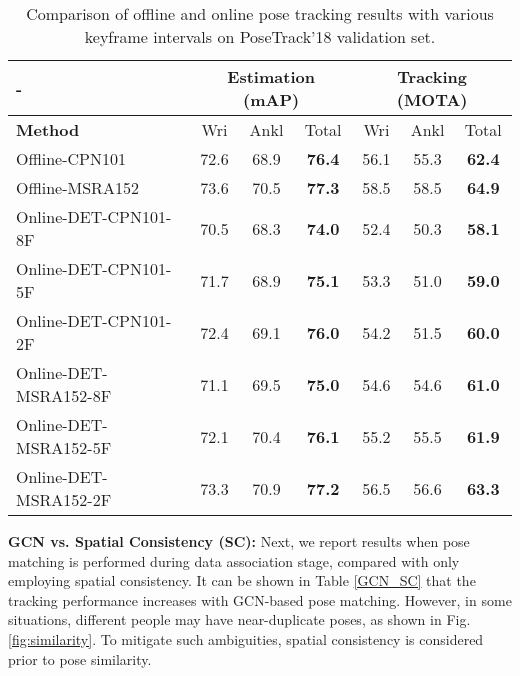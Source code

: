 \documentclass[10pt,twocolumn,letterpaper]{article}
\begin{document}
	\begin{table}[h]
		\vspace{-3pt}
		\setlength{\tabcolsep}{5pt}
		\footnotesize
		\centering 
		\begin{tabular}{lcccccc}
			\toprule
			\multicolumn{1}{l}{ - }  
			&
			\multicolumn{3}{c}{ \textbf{Estimation (mAP) }}  
			&                                            
			\multicolumn{3}{c}{ \textbf{Tracking (MOTA)}} \\\midrule
			\textbf{Method} & Wri  & Ankl & Total  & Wri  & Ankl & Total \\
			\midrule
			Offline-CPN101  &72.6 &68.9 &\textbf{76.4}  &56.1 &55.3 &\textbf{62.4}\\
			Offline-MSRA152  &73.6 &70.5 &\textbf{77.3}  &58.5 &58.5 &\textbf{64.9}\\
			\midrule
			Online-DET-CPN101-8F  &70.5 &68.3 &\textbf{74.0}  &52.4 &50.3 &\textbf{58.1}\\
			Online-DET-CPN101-5F   &71.7  &68.9  &\textbf{75.1}  &53.3 &51.0 &\textbf{59.0}\\
			Online-DET-CPN101-2F   &72.4 &69.1 &\textbf{76.0}  &54.2 &51.5 &\textbf{60.0}\\
			\midrule
			Online-DET-MSRA152-8F  &71.1 &69.5 &\textbf{75.0}  &54.6 &54.6 &\textbf{61.0}\\
			Online-DET-MSRA152-5F   &72.1 & 70.4 &\textbf{76.1}  &55.2 &55.5 &\textbf{61.9}\\
			Online-DET-MSRA152-2F   &73.3 & 70.9 &\textbf{77.2}  &56.5 &56.6 &\textbf{63.3}\\
			\bottomrule
		\end{tabular}
		\vspace{3pt}
		\caption{Comparison of offline and online pose tracking results with various keyframe intervals on PoseTrack'18 validation set. }
		\label{offline-online}
		\vspace{-.2in}
	\end{table}
	
	
	
	\noindent\textbf{GCN vs. Spatial Consistency (SC):} Next, we report results when pose matching is performed during data association stage, compared with only employing spatial consistency. 
	It can be shown in Table \ref{GCN_SC} that the tracking performance increases with GCN-based pose matching. 
	However, in some situations, different people may have near-duplicate poses, as shown in Fig. \ref{fig:similarity}. To mitigate such ambiguities, spatial consistency is considered prior to pose similarity. 
	
\end{document}
